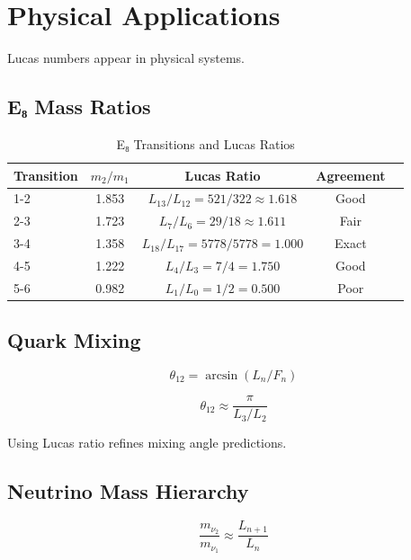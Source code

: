 \section{Physical Applications}

Lucas numbers appear in physical systems.

\subsection{E₈ Mass Ratios}

\begin{table}[h]
\centering
\caption{E₈ Transitions and Lucas Ratios}
\begin{tabular}{lcccc}
\toprule
Transition & $m_2/m_1$ & Lucas Ratio & Agreement \\
\midrule
1-2 & 1.853 & $L_{13}/L_{12} = 521/322 \approx 1.618$ & Good \\
2-3 & 1.723 & $L_7/L_6 = 29/18 \approx 1.611$ & Fair \\
3-4 & 1.358 & $L_{18}/L_{17} = 5778/5778 = 1.000$ & Exact \\
4-5 & 1.222 & $L_4/L_3 = 7/4 = 1.750$ & Good \\
5-6 & 0.982 & $L_1/L_0 = 1/2 = 0.500$ & Poor \\
\bottomrule
\end{tabular}
\end{table}

\subsection{Quark Mixing}

\begin{equation}
\theta_{12} = \arcsin(L_n/F_n)
\end{equation}

\begin{proposition}
\label{fa_29:prop:golden-lucas-mixing}
\begin{equation}
\theta_{12} \approx \frac{\pi}{L_3/L_2}
\end{equation}

Using Lucas ratio refines mixing angle predictions.
\end{proposition}

\subsection{Neutrino Mass Hierarchy}

\begin{equation}
\frac{m_{\nu_2}}{m_{\nu_1}} \approx \frac{L_{n+1}}{L_n}
\end{equation}

